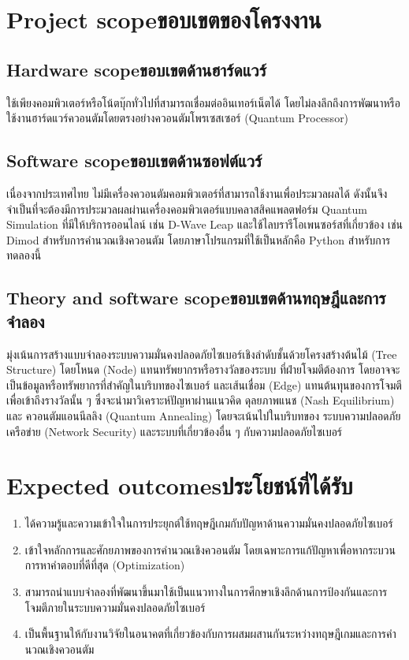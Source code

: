 \section{\ifenglish Project scope\else ขอบเขตของโครงงาน\fi}

\subsection{\ifenglish Hardware scope\else ขอบเขตด้านฮาร์ดแวร์\fi}
ใช้เพียงคอมพิวเตอร์หรือโน้ตบุ๊กทั่วไปที่สามารถเชื่อมต่ออินเทอร์เน็ตได้ โดยไม่ลงลึกถึงการพัฒนาหรือใช้งานฮาร์ดแวร์ควอนตัมโดยตรงอย่างควอนตัมโพรเซสเซอร์ (Quantum Processor)

\subsection{\ifenglish Software scope\else ขอบเขตด้านซอฟต์แวร์\fi}
เนื่องจากประเทศไทย ไม่มีเครื่องควอนตัมคอมพิวเตอร์ที่สามารถใช้งานเพื่อประมวลผลได้ ดังนั้นจึงจำเป็นที่จะต้องมีการประมวลผลผ่านเครื่องคอมพิวเตอร์แบบคลาสสิคแพลตฟอร์ม Quantum Simulation ที่มีให้บริการออนไลน์ เช่น D-Wave Leap และใช้ไลบรารีโอเพนซอร์สที่เกี่ยวข้อง เช่น Dimod สำหรับการคำนวณเชิงควอนตัม โดยภาษาโปรแกรมที่ใช้เป็นหลักคือ Python สำหรับการทดลองนี้

\subsection{\ifenglish Theory and software scope\else  ขอบเขตด้านทฤษฎีและการจำลอง\fi}
มุ่งเน้นการสร้างแบบจำลองระบบความมั่นคงปลอดภัยไซเบอร์เชิงลำดับชั้นด้วยโครงสร้างต้นไม้ (Tree Structure) โดยโหนด (Node) แทนทรัพยากรหรือรางวัลของระบบ ที่ฝ่ายโจมตีต้องการ โดยอาจจะเป็นข้อมูลหรือทรัพยากรที่สำคัญในบริบทของไซเบอร์ และเส้นเชื่อม (Edge) แทนต้นทุนของการโจมตีเพื่อเข้าถึงรางวัลนั้น ๆ ซึ่งจะนำมาวิเคราะห์ปัญหาผ่านแนวคิด ดุลยภาพแนช (Nash Equilibrium) และ ควอนตัมแอนนีลลิง (Quantum Annealing) โดยจะเน้นไปในบริบทของ ระบบความปลอดภัยเครือข่าย (Network Security) และระบบที่เกี่ยวข้องอื่น ๆ กับความปลอดภัยไซเบอร์

\section{\ifenglish Expected outcomes\else ประโยชน์ที่ได้รับ\fi}
\begin{enumerate}
    \item ได้ความรู้และความเข้าใจในการประยุกต์ใช้ทฤษฎีเกมกับปัญหาด้านความมั่นคงปลอดภัยไซเบอร์
    \item  เข้าใจหลักการและศักยภาพของการคำนวณเชิงควอนตัม โดยเฉพาะการแก้ปัญหาเพื่อหากระบวนการหาคำตอบที่ดีที่สุด (Optimization)
    \item สามารถนำแบบจำลองที่พัฒนาขึ้นมาใช้เป็นแนวทางในการศึกษาเชิงลึกด้านการป้องกันและการโจมตีภายในระบบความมั่นคงปลอดภัยไซเบอร์
    \item เป็นพื้นฐานให้กับงานวิจัยในอนาคตที่เกี่ยวข้องกับการผสมผสานกันระหว่างทฤษฎีเกมและการคำนวณเชิงควอนตัม
\end{enumerate}

